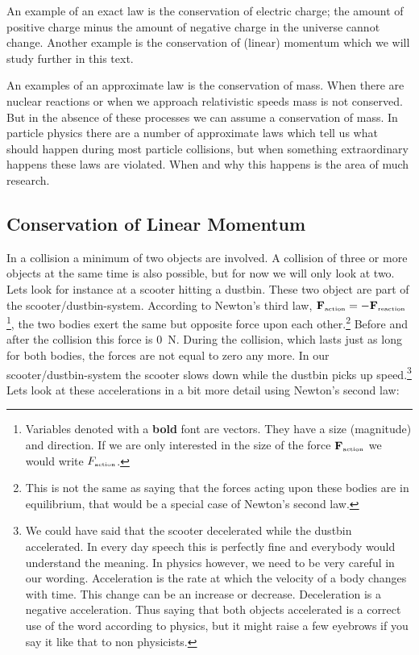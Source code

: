 An example of an exact law is the conservation of electric charge; the amount of positive charge minus the amount of negative charge in the universe cannot change. Another example is the conservation of (linear) momentum which we will study further in this text.

An examples of an approximate law is the conservation of mass. When there are nuclear reactions or when we approach relativistic speeds mass is not conserved. But in the absence of these processes we can assume a conservation of mass. In particle physics there are a number of approximate laws which tell us what should happen during most particle collisions, but when something extraordinary happens these laws are violated. When and why this happens is the area of much research.

\subsection{Conservation of Linear Momentum}
In a collision a minimum of two objects are involved. A collision of three or more objects at the same time is also possible, but for now we will only look at two. Lets look for instance at a scooter hitting a dustbin. These two object are part of the scooter/dustbin-system. According to Newton's third law, $\textbf{F}_{\begin{tiny}\mbox{action}\end{tiny}}=-\textbf{F}_{\begin{tiny}\mbox{reaction}\end{tiny}}$\footnote{Variables denoted with a \textbf{bold} font are vectors. They have a size (magnitude) and direction. If we are only interested in the size of the force $\textbf{F}_{\begin{tiny}\mbox{action}\end{tiny}}$ we would write $F_{\begin{tiny}\mbox{action}\end{tiny}}$.}, the two bodies exert the same but opposite force upon each other.\footnote{This is not the same as saying that the forces acting upon these bodies are in equilibrium, that would be a special case of Newton's second law.} Before and after the collision this force is 0~N. During the collision, which lasts just as long for both bodies, the forces are not equal to zero any more. In our scooter/dustbin-system the scooter slows down while the dustbin picks up speed.\footnote{We could have said that the scooter decelerated while the dustbin accelerated. In every day speech this is perfectly fine and everybody would understand the meaning. In physics however, we need to be very careful in our wording. Acceleration is the rate at which the velocity of a body changes with time. This change can be an increase or decrease. Deceleration is a negative acceleration. Thus saying that both objects accelerated is a correct use of the word according to physics, but it might raise a few eyebrows if you say it like that to non physicists.} Lets look at these accelerations in a bit more detail using Newton's second law:
